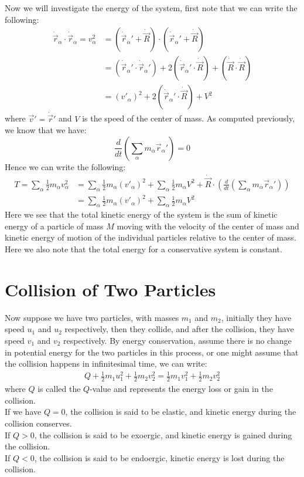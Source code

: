 \documentclass[11pt,oneside]{book}
\theoremstyle{break}
\theoremstyle{break}
\begin{document}
Now we will investigate the energy of the system, first note that we can write the following:
\begin{align*}
\dot{\vec{r}}_{\alpha} \cdot \dot{\vec{r}}_{\alpha} = v_{\alpha}^2 &= \left(\dot{\vec{r}}_{\alpha}' + \dot{\vec{R}}\right)\cdot \left(\dot{\vec{r}}_{\alpha}' + \dot{\vec{R}}\right)\\
&=\left(\dot{\vec{r}}_{\alpha}' \cdot \dot{\vec{r}}_{\alpha}'\right)+2\left(\dot{\vec{r}}_{\alpha}'\cdot \dot{\vec{R}}\right) + \left(\dot{\vec{R}}\cdot \dot{\vec{R}}\right)\\
&= \left(v'_{\alpha}\right)^2 + 2\left(\dot{\vec{r}}_{\alpha}' \cdot \dot{\vec{R}}\right)+ V^2 
\end{align*}
where $\vec{v}' = \dot{\vec{r}}'$ and $V$ is the speed of the center of mass. As computed previously, we know that we have: 
$$\frac{d}{dt}\left( \sum_{\alpha}m_{\alpha}\vec{r}_{\alpha}' \right)= 0$$
Hence we can write the following:
\begin{align*}
T = \sum_{\alpha}\frac{1}{2}m_{\alpha}v_{\alpha}^2 &= \sum_{\alpha}\frac{1}{2}m_{\alpha}(v'_{\alpha})^2 + \sum_{\alpha}\frac{1}{2}m_{\alpha}V^2 + \dot{\vec{R}}\cdot \left(\frac{d}{dt}\left( \sum_{\alpha}m_{\alpha}\vec{r}_{\alpha}' \right)\right) \\
&=\sum_{\alpha}\frac{1}{2}m_{\alpha}(v'_{\alpha})^2 + \sum_{\alpha}\frac{1}{2}m_{\alpha}V^2 
\end{align*}
Here we see that the total kinetic energy of the system is the sum of kinetic energy of a particle of mass $M$ moving with the velocity of the center of mass and kinetic energy of motion of the individual particles  relative to the center of mass. Here we also note that the total energy for a conservative system is constant.\\
\newpage

\section[Collision of Two Particles]{\color{red}Collision of Two Particles\color{black}}
Now suppose we have two particles, with masses $m_1$ and $m_2$, initially they have speed $u_1$ and $u_2$ respectively, then they collide, and after the collision, they have speed $v_1$ and $v_2$ respectively. By energy conservation, assume there is no change in potential energy for the two particles in this process, or one might assume that the collision happens in infinitesimal time, we can write:
\begin{align*}
Q + \frac{1}{2}m_1u_1^2 + \frac{1}{2}m_2 v_2^2 = \frac{1}{2}m_1v_1^2 + \frac{1}{2}m_2v_2^2
\end{align*}
where $Q$ is called the $Q$-value and represents the energy loss or gain in the collision. \\
If we have $Q = 0$, the collision is said to be elastic, and kinetic energy during the collision conserves.\\ If $Q>0$, the collision is said to be exoergic, and kinetic energy is gained during the collision. \\If $Q<0$, the collision is said to be endoergic, kinetic energy is lost during the collision. \\
\end{document}
